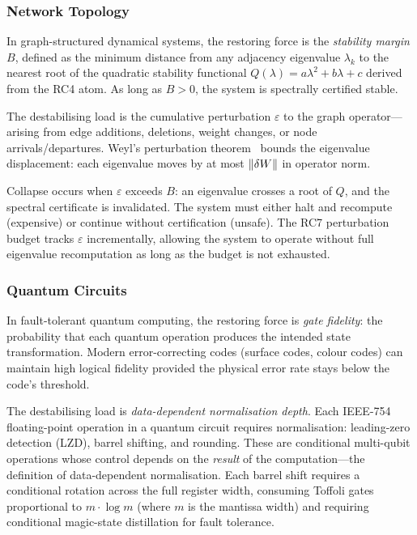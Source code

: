 \documentclass[10pt,twocolumn]{article}
\theoremstyle{definition}
\theoremstyle{remark}
\DeclarePairedDelimiter{\norm}{\lVert}{\rVert}
\begin{document}
\subsubsection{Network Topology}

In graph-structured dynamical systems, the restoring force is the \emph{stability margin} $B$, defined as the minimum distance from any adjacency eigenvalue $\lambda_k$ to the nearest root of the quadratic stability functional $Q(\lambda) = a\lambda^2 + b\lambda + c$ derived from the RC4 atom.  As long as $B > 0$, the system is spectrally certified stable.

The destabilising load is the cumulative perturbation $\varepsilon$ to the graph operator---arising from edge additions, deletions, weight changes, or node arrivals/departures.  Weyl's perturbation theorem~\cite{Weyl} bounds the eigenvalue displacement: each eigenvalue moves by at most $\norm{\delta W}$ in operator norm.

Collapse occurs when $\varepsilon$ exceeds $B$: an eigenvalue crosses a root of $Q$, and the spectral certificate is invalidated.  The system must either halt and recompute (expensive) or continue without certification (unsafe).  The RC7 perturbation budget tracks $\varepsilon$ incrementally, allowing the system to operate without full eigenvalue recomputation as long as the budget is not exhausted.

\subsubsection{Quantum Circuits}

In fault-tolerant quantum computing, the restoring force is \emph{gate fidelity}: the probability that each quantum operation produces the intended state transformation.  Modern error-correcting codes (surface codes, colour codes) can maintain high logical fidelity provided the physical error rate stays below the code's threshold.

The destabilising load is \emph{data-dependent normalisation depth}.  Each IEEE-754 floating-point operation in a quantum circuit requires normalisation: leading-zero detection (LZD), barrel shifting, and rounding.  These are conditional multi-qubit operations whose control depends on the \emph{result} of the computation---the definition of data-dependent normalisation.  Each barrel shift requires a conditional rotation across the full register width, consuming Toffoli gates proportional to $m \cdot \log m$ (where $m$ is the mantissa width) and requiring conditional magic-state distillation for fault tolerance.
\end{document}
